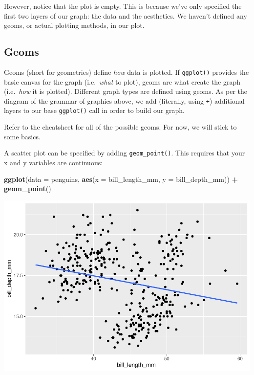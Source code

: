 \documentclass[
]{book}
\newenvironment{Shaded}{\begin{snugshade}}{\end{snugshade}}
\newcommand{\AttributeTok}[1]{\textcolor[rgb]{0.13,0.29,0.53}{#1}}
\newcommand{\FunctionTok}[1]{\textcolor[rgb]{0.13,0.29,0.53}{\textbf{#1}}}
\newcommand{\NormalTok}[1]{#1}
\newcommand{\SpecialCharTok}[1]{\textcolor[rgb]{0.81,0.36,0.00}{\textbf{#1}}}
\begin{document}
However, notice that the plot is empty. This is because we've only specified the first two layers of our graph: the data and the aesthetics. We haven't defined any geoms, or actual plotting methods, in our plot.

\subsection{Geoms}\label{geoms}

Geoms (short for geometries) define \emph{how} data is plotted. If \texttt{ggplot()} provides the basic canvas for the graph (i.e.~\emph{what} to plot), geoms are what create the graph (i.e.~\emph{how} it is plotted). Different graph types are defined using geoms. As per the diagram of the grammar of graphics above, we add (literally, using \texttt{+}) additional layers to our base \texttt{ggplot()} call in order to build our graph.

Refer to the cheatsheet for all of the possible geoms. For now, we will stick to some basics.

A scatter plot can be specified by adding \texttt{geom\_point()}. This requires that your x and y variables are continuous:

\begin{Shaded}
\begin{Highlighting}[]
\FunctionTok{ggplot}\NormalTok{(}\AttributeTok{data =}\NormalTok{ penguins, }\FunctionTok{aes}\NormalTok{(}\AttributeTok{x =}\NormalTok{ bill\_length\_mm, }\AttributeTok{y =}\NormalTok{ bill\_depth\_mm)) }\SpecialCharTok{+} 
  \FunctionTok{geom\_point}\NormalTok{()}
\end{Highlighting}
\end{Shaded}

\includegraphics{_main_files/figure-latex/unnamed-chunk-53-1.pdf}
\end{document}

